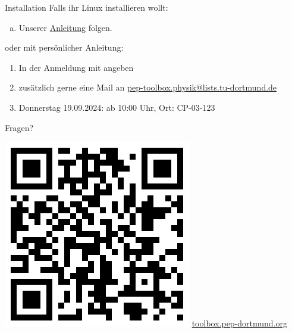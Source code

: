 \begin{frame}{Installation}
  \huge
  Falls ihr Linux installieren wollt:\\[0.5\baselineskip]
	\begin{enumerate}[a)]
    \item Unserer \href{https://toolbox.pep-dortmund.org/install/dualboot/}{Anleitung} folgen.
  \end{enumerate}
  oder mit persönlicher Anleitung:
  \begin{enumerate}
    \item In der Anmeldung mit angeben
    \item zusätzlich gerne eine Mail an \href{mailto:pep-toolbox.physik@lists.tu-dortmund.de}{pep-toolbox.physik@lists.tu-dortmund.de}
    \item Donnerstag 19.09.2024: ab 10:00 Uhr, Ort: CP-03-123
  \end{enumerate}
\end{frame}
\begin{frame}
  \begin{minipage}{.5\textwidth}
    \Huge\centering
    \textcolor{red!70!black}{Fragen?}
  \end{minipage}
  \begin{minipage}{.49\textwidth}
    \centering
    \includegraphics[width=.8\textwidth]{../qrcode/toolbox_qrcode.png}
    \Large
    \url{toolbox.pep-dortmund.org}
  \end{minipage}
\end{frame}

